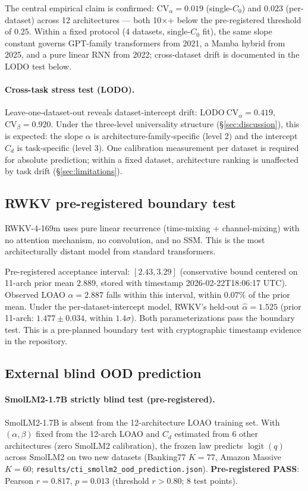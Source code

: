 \documentclass{article}
\DeclareMathOperator{\logit}{logit}
\begin{document}
The central empirical claim is confirmed: $\mathrm{CV}_\alpha=0.019$ (single-$C_0$) and $0.023$ (per-dataset) across 12 architectures --- both 10$\times$+ below the pre-registered threshold of 0.25. Within a fixed protocol (4 datasets, single-$C_0$ fit), the same slope constant governs GPT-family transformers from 2021, a Mamba hybrid from 2025, and a pure linear RNN from 2022; cross-dataset drift is documented in the LODO test below.

\paragraph{Cross-task stress test (LODO).}
Leave-one-dataset-out reveals dataset-intercept drift: $\mathrm{LODO\ CV}_\alpha=0.419$, $\mathrm{CV}_\beta=0.920$. Under the three-level universality structure (\S\ref{sec:discussion}), this is expected: the slope $\alpha$ is architecture-family-specific (level 2) and the intercept $C_d$ is task-specific (level 3). One calibration measurement per dataset is required for absolute prediction; within a fixed dataset, architecture ranking is unaffected by task drift (\S\ref{sec:limitations}).

\subsection{RWKV pre-registered boundary test}
\label{subsec:rwkv-test}
RWKV-4-169m uses pure linear recurrence (time-mixing + channel-mixing) with no attention mechanism, no convolution, and no SSM. This is the most architecturally distant model from standard transformers.

Pre-registered acceptance interval: $[2.43, 3.29]$ (conservative bound centered on 11-arch prior mean $2.889$, stored with timestamp 2026-02-22T18:06:17 UTC). Observed LOAO $\alpha=2.887$ falls within this interval, within $0.07\%$ of the prior mean. Under the per-dataset-intercept model, RWKV's held-out $\hat\alpha=1.525$ (prior 11-arch: $1.477\pm0.034$, within $1.4\sigma$). Both parameterizations pass the boundary test. This is a pre-planned boundary test with cryptographic timestamp evidence in the repository.

\subsection{External blind OOD prediction}
\label{subsec:smollm2-ood}
\paragraph{SmolLM2-1.7B strictly blind test (pre-registered).}
SmolLM2-1.7B is absent from the 12-architecture LOAO training set. With $(\alpha,\beta)$ fixed from the 12-arch LOAO and $C_d$ estimated from 6 other architectures (zero SmolLM2 calibration), the frozen law predicts $\logit(q)$ across SmolLM2 on two new datasets (Banking77 $K=77$, Amazon Massive $K=60$; \texttt{results/cti\_smollm2\_ood\_prediction.json}).
\textbf{Pre-registered PASS}: Pearson $r=0.817$, $p=0.013$ (threshold $r>0.80$; 8 test points).
\end{document}
